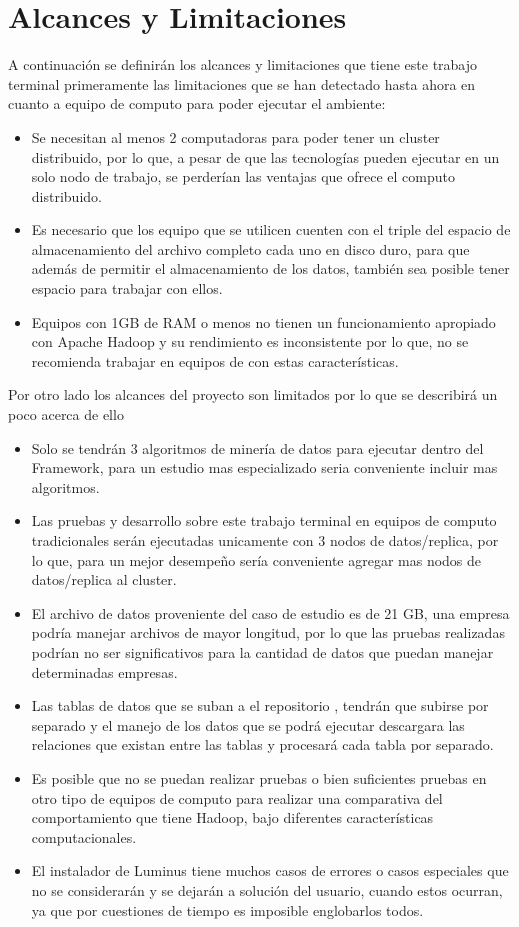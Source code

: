 \section{Alcances y Limitaciones}
A continuación se definirán los alcances y limitaciones que tiene este trabajo terminal 
primeramente las limitaciones que se han detectado hasta ahora en cuanto a equipo de computo para poder ejecutar el ambiente:
\begin{itemize}
	\item Se necesitan al menos 2 computadoras para poder tener un cluster distribuido, por lo que, a pesar de que las tecnologías pueden ejecutar en un solo nodo de trabajo, se perderían las ventajas que ofrece el computo distribuido.
	\item Es necesario que los equipo que se utilicen cuenten con el triple del espacio de almacenamiento del archivo completo cada uno en disco duro, para que además de permitir el almacenamiento de los datos, también sea posible tener espacio para trabajar con ellos.
	\item Equipos con 1GB de RAM o menos no tienen un funcionamiento apropiado con Apache Hadoop y su rendimiento es inconsistente por lo que, no se recomienda trabajar en equipos de con estas características.  
\end{itemize}
Por otro lado los alcances del proyecto son limitados por lo que se describirá un poco acerca de ello
\begin{itemize}
	\item Solo se tendrán 3 algoritmos de minería de datos para ejecutar dentro del Framework, para un estudio mas especializado seria conveniente incluir mas algoritmos.
	\item Las pruebas y desarrollo sobre este trabajo terminal en equipos de computo tradicionales serán ejecutadas unicamente con 3 nodos de datos/replica, por lo que, para un mejor desempeño sería conveniente agregar mas nodos de datos/replica al cluster.
	\item El archivo de datos proveniente del caso de estudio es de 21 GB, una empresa podría manejar archivos de mayor longitud, por lo que las pruebas realizadas podrían no ser significativos para la cantidad de datos que puedan manejar determinadas empresas. 
	\item Las tablas de datos que se suban a el repositorio , tendrán que subirse por separado y el manejo de los datos que se podrá ejecutar descargara las relaciones que existan entre las tablas y procesará cada tabla por separado.
	\item Es posible que no se puedan realizar pruebas o bien suficientes pruebas en otro tipo de equipos de computo para realizar una comparativa del comportamiento que tiene Hadoop, bajo diferentes características computacionales.
	\item El instalador de Luminus tiene muchos casos de errores o casos especiales que no se considerarán y se dejarán a solución del usuario, cuando estos ocurran, ya que por cuestiones de tiempo es imposible englobarlos todos.
	 
\end{itemize}